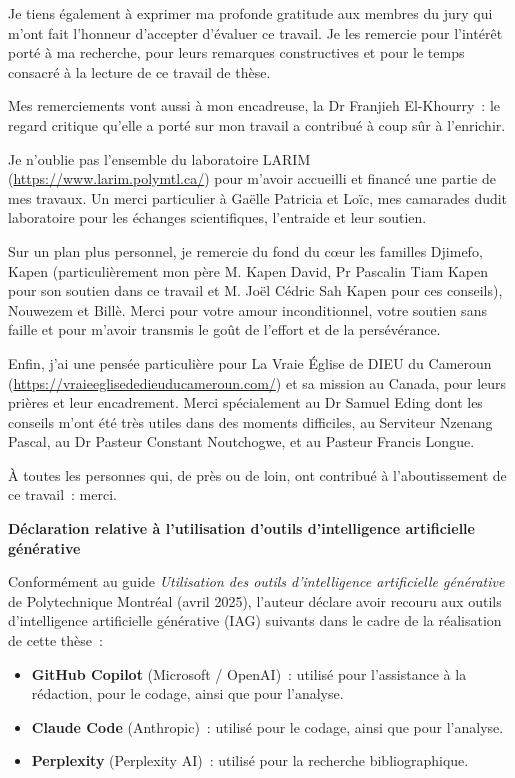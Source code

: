 \medskip
\noindent Je tiens également à exprimer ma profonde gratitude aux membres du jury qui m'ont fait l'honneur d'accepter d'évaluer ce travail. Je les remercie pour l'intérêt porté à ma recherche, pour leurs remarques constructives et pour le temps consacré à la lecture de ce travail de thèse.

\medskip
\noindent Mes remerciements vont aussi à mon encadreuse, la Dr Franjieh El-Khourry~: le regard critique qu'elle a porté sur mon travail a contribué à coup sûr à l'enrichir.

\medskip
\noindent Je n'oublie pas l'ensemble du laboratoire LARIM (\url{https://www.larim.polymtl.ca/}) pour m'avoir accueilli et financé une partie de mes travaux. Un merci particulier à Gaëlle Patricia et Loïc, mes camarades dudit laboratoire pour les échanges scientifiques, l'entraide et leur soutien.

\medskip
\noindent Sur un plan plus personnel, je remercie du fond du c\oe{}ur les familles Djimefo, Kapen (particulièrement mon père M. Kapen David, Pr Pascalin Tiam Kapen pour son soutien dans ce travail et M. Joël Cédric Sah Kapen pour ces conseils), Nouwezem et Billè. Merci pour votre amour inconditionnel, votre soutien sans faille et pour m'avoir transmis le goût de l'effort et de la persévérance.

\medskip
\noindent Enfin, j'ai une pensée particulière pour La Vraie Église de DIEU du Cameroun (\url{https://vraieeglisededieuducameroun.com/}) et sa mission au Canada, pour leurs prières et leur encadrement. Merci spécialement au Dr Samuel Eding dont les conseils m'ont été très utiles dans des moments difficiles, au Serviteur Nzenang Pascal, au Dr Pasteur Constant Noutchogwe, et au Pasteur Francis Longue.

\medskip
\noindent À toutes les personnes qui, de près ou de loin, ont contribué à l'aboutissement de ce travail~: merci.

\bigskip
\noindent\textbf{Déclaration relative à l'utilisation d'outils d'intelligence artificielle générative}

\medskip
\noindent Conformément au guide \textit{Utilisation des outils d'intelligence artificielle générative} de Polytechnique Montréal (avril 2025), l'auteur déclare avoir recouru aux outils d'intelligence artificielle générative (IAG) suivants dans le cadre de la réalisation de cette thèse~:

\begin{itemize}
    \item \textbf{GitHub Copilot} (Microsoft / OpenAI)~: utilisé pour l'assistance à la rédaction, pour le codage, ainsi que pour l'analyse.

    \item \textbf{Claude Code} (Anthropic)~: utilisé pour le codage, ainsi que pour l'analyse.

    \item \textbf{Perplexity} (Perplexity AI)~: utilisé pour la recherche bibliographique.
\end{itemize}
